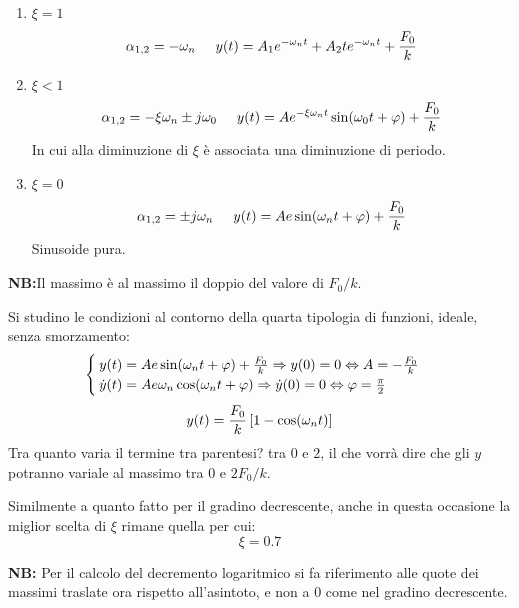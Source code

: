 \documentclass[a4paper, 15pt]{article}
\begin{document}
\begin{adjustwidth}{2in}{}
\begin{enumerate}[label=\Roman*.]
	\item \( \xi = 1 \) 
	\[ \alpha_{1,2} = -\omega_n \hspace{0.5cm} y(t) = A_1e^{-\omega_n t} + A_2te^{-\omega_n t} + {F_0\over k} \]
	\item \( \xi < 1 \) 
	\[\alpha_{1,2} = -\xi\omega_n \pm j\omega_0 \hspace{0.5cm} y(t) = Ae^{-\xi\omega_n t}\sin(\omega_0 t +\varphi) + {F_0\over k} \]	
	In cui alla diminuzione di $\xi$ è associata una diminuzione di periodo. 
	\item\( \xi =0 \) 
	\[ \alpha_{1,2} = \pm j\omega_n \hspace{0.5cm} y(t) = Ae\sin(\omega_n t +\varphi) + {F_0\over k} \]	
	Sinusoide pura.  
\end{enumerate}

	\textbf{NB:}Il massimo è al massimo il doppio del valore di $F_0/k$. \newline 
	
	Si studino le condizioni al contorno della quarta tipologia di funzioni, ideale, senza smorzamento: 
	\[\begin{cases}
		y(t) = Ae\sin(\omega_n t +\varphi) + {F_0\over k} \Rightarrow y(0) = 0 \Leftrightarrow A = -{F_0\over k}\\
		\dot{y}(t) = Ae\omega_n\cos(\omega_n t +\varphi)  \Rightarrow \dot{y}(0) = 0 \Leftrightarrow \varphi = {\pi\over 2}
	\end{cases}\]
	\[y(t) = {F_0\over k} \left[1-\cos(\omega_n t)\right]\]
	Tra quanto varia il termine tra parentesi? tra $0$ e $2$, il che vorrà dire che gli $y$ potranno variale al massimo tra $0$ e $2{F_0/k}$. \newline
	
	Similmente a quanto fatto per il gradino decrescente, anche in questa occasione la miglior scelta di $\xi$ rimane quella per cui: 
	\[ \xi = 0.7 \]
	
	\textbf{NB:} Per il calcolo del decremento logaritmico si fa riferimento alle quote dei massimi traslate ora rispetto all'asintoto, e non a $0$ come nel gradino decrescente.  
\end{adjustwidth}
\end{document}
